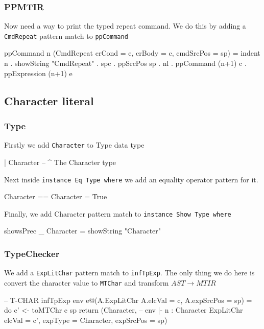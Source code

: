 \documentclass{article}
\begin{document}
\subsubsection{PPMTIR}
\begin{flushleft}
Now need a way to print the typed repeat command. We do this by adding a \texttt{CmdRepeat} pattern match to \texttt{ppCommand}
\end{flushleft}
\begin{code}
ppCommand n (CmdRepeat {crCond = e, crBody = c, cmdSrcPos = sp}) =
    indent n . showString "CmdRepeat" . spc . ppSrcPos sp . nl
    . ppCommand (n+1) c
    . ppExpression (n+1) e
\end{code}

\subsection{Character literal}

\subsubsection{Type}

\begin{flushleft}
Firstly we add \texttt{Character} to Type data type
\end{flushleft}
\begin{code}
| Character           -- ^ The Character type
\end{code}
\begin{flushleft}
Next inside \texttt{instance Eq Type where} we add an equality operator pattern for it.
\end{flushleft}
\begin{code}
Character  == Character  = True
\end{code}
\begin{flushleft}
Finally, we add Character pattern match to \texttt{instance Show Type where}
\end{flushleft}
\begin{code}
showsPrec _ Character  = showString "Character"
\end{code}

\subsubsection{TypeChecker}

\begin{flushleft}
We add a \texttt{ExpLitChar} pattern match to \texttt{infTpExp}. The only thing we do here is convert the character value to \texttt{MTChar} and transform $AST \rightarrow MTIR$
\end{flushleft}
\begin{code}
-- T-CHAR
infTpExp env e@(A.ExpLitChr {A.elcVal = c, A.expSrcPos = sp}) = do
    c' <- toMTChr c sp
    return (Character,                          -- env |- n : Character
            ExpLitChr {elcVal = c', expType = Character, expSrcPos = sp})
\end{code}
\end{document}
